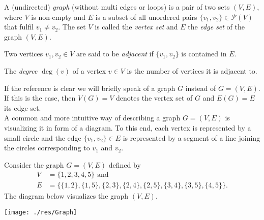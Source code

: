 \begin{defin}
\begin{thmlist}
\item A (undirected) \emph{graph} (without multi edges or loops) is a pair of two sets $(V,E)$, where $V$ is non-empty and $E$ is a subset of all unordered pairs $\lbrace v_1,v_2\rbrace\in\mathcal{P}(V)$ that fulfil $v_1\neq v_2$. The set $V$ is called the \emph{vertex set} and $E$ the \emph{edge set} of the graph $(V,E)$.
\item Two vertices $v_1,v_2\in V$ are said to be \emph{adjacent} if $\lbrace v_1,v_2\rbrace$ is contained in $E$.
\item The \emph{degree} $\deg(v)$ of a vertex $v\in V$ is the number of vertices it is adjacent to.
\end{thmlist}
\end{defin}


If the reference is clear we will briefly speak of a graph $G$ instead of $G=(V,E)$. If this is the case, then $V(G)=V$ denotes the vertex set of $G$ and $E(G)=E$ its edge set.\\
A common and more intuitive way of describing a graph $G=(V,E)$ is visualizing it in form of a diagram. To this end, each vertex is represented by a small circle and the edge $\lbrace v_1,v_2\rbrace\in E$ is represented by a segment of a line joining the circles corresponding to $v_1$ and $v_2$.

\begin{exam}\label{ex:Graph}
Consider the graph $G=(V,E)$ defined by
\begin{align*}
V&=\lbrace 1,2,3,4,5\rbrace \text{ and}\\
E&=\lbrace\lbrace 1,2\rbrace, \lbrace 1, 5\rbrace, \lbrace 2, 3\rbrace, \lbrace 2, 4\rbrace, \lbrace 2, 5 \rbrace, \lbrace 3, 4\rbrace, \lbrace 3, 5\rbrace, \lbrace 4, 5\rbrace\rbrace.
\end{align*}
The diagram below visualizes the graph $(V,E).$

\begin{center}
\texttt{[image: ./res/Graph]}
\end{center}
\end{exam}

